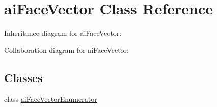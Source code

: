 \hypertarget{classai_face_vector}{\section{ai\+Face\+Vector Class Reference}
\label{classai_face_vector}
}


Inheritance diagram for ai\+Face\+Vector\+:


Collaboration diagram for ai\+Face\+Vector\+:
\subsection*{Classes}
\begin{DoxyCompactItemize}
\item 
class \hyperlink{classai_face_vector_1_1ai_face_vector_enumerator}{ai\+Face\+Vector\+Enumerator}
\end{DoxyCompactItemize}
